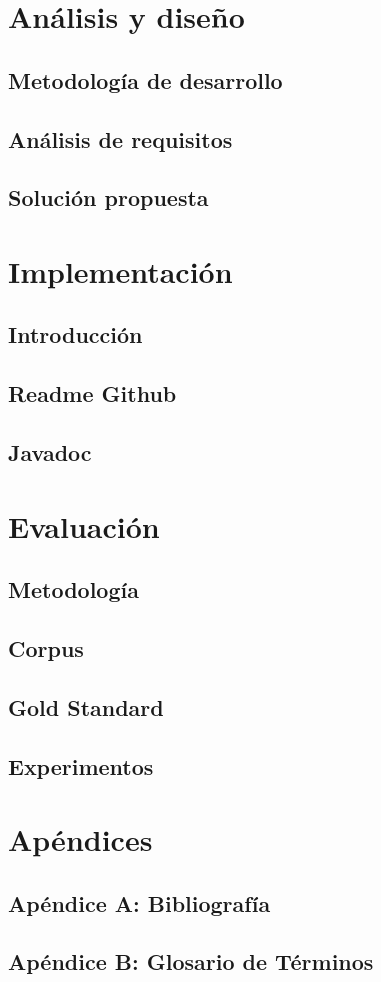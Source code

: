 \documentclass[14pt]{extarticle}
\theoremstyle{definition}
\theoremstyle{remark}
\begin{document}
\section{Análisis y diseño}\label{sec:analisisydiseno}
\subsection{Metodología de desarrollo}\label{sec:metodologiadedesarrollo}
\subsection{Análisis de requisitos}\label{sec:analisisderequisitos}
\subsection{Solución propuesta}\label{sec:solucionpropuesta}
\section{Implementación}\label{sec:implementacion}
\subsection{Introducción}\label{sec:introduccion}
\subsection{Readme Github}\label{sec:readmegithub}
\subsection{Javadoc}\label{sec:javadoc}
\section{Evaluación}\label{sec:evaluacion}
\subsection{Metodología}\label{sec:metodologia}
\subsection{Corpus}\label{sec:corpus}
\subsection{Gold Standard}\label{sec:goalstandard}
\subsection{Experimentos}\label{sec:experimentos}
\section{Apéndices}\label{sec:apendices}
\subsection{Apéndice A: Bibliografía}\label{sec:bibliografia}



\newpage
\subsection{Apéndice B: Glosario de Términos}\label{sec:glosariodeterminos}
\end{document}
